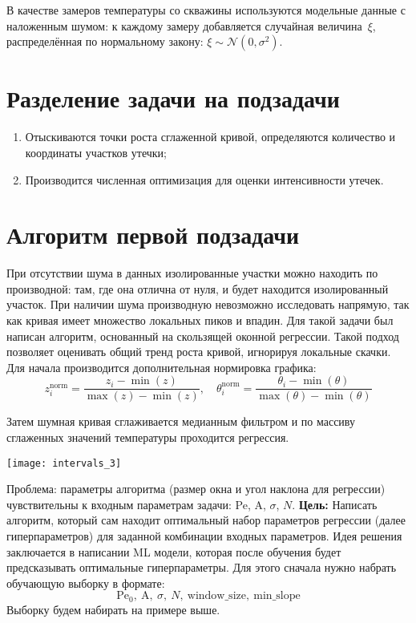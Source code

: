 \documentclass[12pt]{article}
\begin{document}
В качестве замеров температуры со скважины используются модельные данные с наложенным шумом: к каждому замеру
добавляется случайная величина~$\xi$, распределённая по нормальному закону: $\xi \sim \mathcal{N}(0, \sigma^2)$.
\section*{Разделение задачи на подзадачи}

\begin{enumerate}
    \item Отыскиваются точки роста сглаженной кривой, определяются количество и координаты участков утечки;
    \item Производится численная оптимизация для оценки интенсивности утечек.
\end{enumerate}

\section*{Алгоритм первой подзадачи}

При отсутствии шума в данных изолированные участки можно находить по производной: там, где она отлична от нуля, и будет находится изолированный участок.
При наличии шума производную невозможно исследовать напрямую, так как кривая имеет множество локальных пиков и впадин. Для такой задачи был написан алгоритм, основанный на скользящей оконной регрессии. Такой подход позволяет оценивать общий тренд роста кривой,
игнорируя локальные скачки. Для начала производится дополнительная нормировка графика:
\[
z_i^{\text{norm}} = \frac{z_i - \min(z)}{\max(z) - \min(z)}, \quad
\theta_i^{\text{norm}} = \frac{\theta_i - \min(\theta)}{\max(\theta) - \min(\theta)}
\]

Затем шумная кривая сглаживается медианным фильтром и по массиву сглаженных значений температуры проходится регрессия.

\begin{center}
    \texttt{[image: intervals\_3]}
\end{center}

Проблема: параметры алгоритма (размер окна и угол наклона для регрессии) чувствительны к входным параметрам задачи: Pe, A, $\sigma$, $N$.
\textbf{Цель:} Написать алгоритм, который сам находит оптимальный набор параметров регрессии (далее гиперпараметров) для заданной комбинации входных параметров. Идея решения заключается в написании
ML модели, которая после обучения будет предсказывать оптимальные гиперпараметры. Для этого сначала нужно набрать обучающую выборку в формате:
\[
\text{Pe}_0,\ \text{A},\ \sigma,\ N,\ \text{window\_size},\ \text{min\_slope}
\]
Выборку будем набирать на примере выше.
\end{document}
